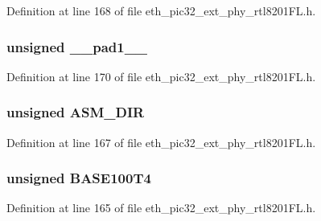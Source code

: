 Definition at line 168 of file eth\+\_\+pic32\+\_\+ext\+\_\+phy\+\_\+rtl8201\+F\+L.\+h.

\hypertarget{union_____a_n_a_dbits__t_acaf2d0924a107ec6e8d2e31febaf66f9}{}
\subsubsection[{\+\_\+\+\_\+pad1\+\_\+\+\_\+}]{\setlength{\rightskip}{0pt plus 5cm}unsigned \+\_\+\+\_\+pad1\+\_\+\+\_\+}\label{union_____a_n_a_dbits__t_acaf2d0924a107ec6e8d2e31febaf66f9}


Definition at line 170 of file eth\+\_\+pic32\+\_\+ext\+\_\+phy\+\_\+rtl8201\+F\+L.\+h.

\hypertarget{union_____a_n_a_dbits__t_a9ce4718733bcc9d125f46da36557d868}{}
\subsubsection[{A\+S\+M\+\_\+\+D\+I\+R}]{\setlength{\rightskip}{0pt plus 5cm}unsigned A\+S\+M\+\_\+\+D\+I\+R}\label{union_____a_n_a_dbits__t_a9ce4718733bcc9d125f46da36557d868}


Definition at line 167 of file eth\+\_\+pic32\+\_\+ext\+\_\+phy\+\_\+rtl8201\+F\+L.\+h.

\hypertarget{union_____a_n_a_dbits__t_ae7aa36d7ff2e31c4eb9726c67e04dfea}{}
\subsubsection[{B\+A\+S\+E100\+T4}]{\setlength{\rightskip}{0pt plus 5cm}unsigned B\+A\+S\+E100\+T4}\label{union_____a_n_a_dbits__t_ae7aa36d7ff2e31c4eb9726c67e04dfea}


Definition at line 165 of file eth\+\_\+pic32\+\_\+ext\+\_\+phy\+\_\+rtl8201\+F\+L.\+h.

